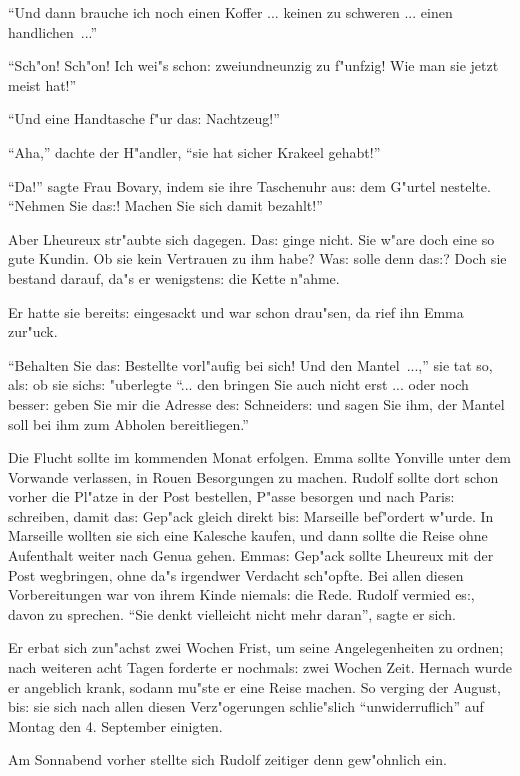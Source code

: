 \documentclass[oneside,12pt]{book}
\newcommand{\s}{s:}%
\begin{document}
"`Und dann brauche ich noch einen Koffer ... keinen zu schweren
... einen handlichen~..."'

"`Sch"on! Sch"on! Ich wei"s schon: zweiundneunzig zu f"unfzig! Wie
man sie jetzt meist hat!"'

"`Und eine Handtasche f"ur da{\s} Nachtzeug!"'

"`Aha,"' dachte der H"andler, "`sie hat sicher Krakeel gehabt!"'

"`Da!"' sagte Frau Bovary, indem sie ihre Taschenuhr au{\s} dem
G"urtel nestelte. "`Nehmen Sie da{\s}! Machen Sie sich damit
bezahlt!"'

Aber Lheureux str"aubte sich dagegen. Da{\s} ginge nicht. Sie
w"are doch eine so gute Kundin. Ob sie kein Vertrauen zu ihm habe?
Wa{\s} solle denn da{\s}? Doch sie bestand darauf, da"s er
wenigsten{\s} die Kette n"ahme.

Er hatte sie bereit{\s} eingesackt und war schon drau"sen, da rief
ihn Emma zur"uck.

"`Behalten Sie da{\s} Bestellte vorl"aufig bei sich! Und den
Mantel~...,"' sie tat so, al{\s} ob sie sich{\s} "uberlegte "`...
den bringen Sie auch nicht erst ... oder noch besser: geben Sie
mir die Adresse de{\s} Schneider{\s} und sagen Sie ihm, der Mantel
soll bei ihm zum Abholen bereitliegen."'

Die Flucht sollte im kommenden Monat erfolgen. Emma sollte
Yonville unter dem Vorwande verlassen, in Rouen Besorgungen zu
machen. Rudolf sollte dort schon vorher die Pl"atze in der Post
bestellen, P"asse besorgen und nach Pari{\s} schreiben, damit
da{\s} Gep"ack gleich direkt bi{\s} Marseille bef"ordert w"urde.
In Marseille wollten sie sich eine Kalesche kaufen, und dann
sollte die Reise ohne Aufenthalt weiter nach Genua gehen. Emma{\s}
Gep"ack sollte Lheureux mit der Post wegbringen, ohne da"s
irgendwer Verdacht sch"opfte. Bei allen diesen Vorbereitungen war
von ihrem Kinde niemal{\s} die Rede. Rudolf vermied e{\s}, davon
zu sprechen. "`Sie denkt vielleicht nicht mehr daran"', sagte er
sich.

Er erbat sich zun"achst zwei Wochen Frist, um seine Angelegenheiten
zu ordnen; nach weiteren acht Tagen forderte er nochmal{\s} zwei
Wochen Zeit. Hernach wurde er angeblich krank, sodann mu"ste er
eine Reise machen. So verging der August, bi{\s} sie sich nach
allen diesen Verz"ogerungen schlie"slich "`unwiderruflich"' auf
Montag den 4. September einigten.

Am Sonnabend vorher stellte sich Rudolf zeitiger denn gew"ohnlich
ein.
\end{document}
